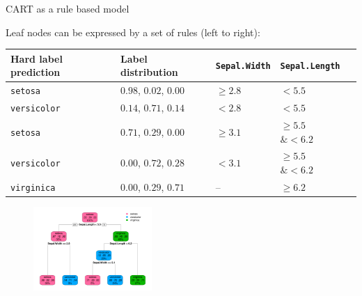 \documentclass[11pt,compress,t,notes=noshow, xcolor=table]{beamer}
\begin{document}
\begin{vbframe}{CART as a rule based model}

Leaf nodes can be expressed by a set of rules (left to right):

\begin{table}[]
\begin{tabular}{lllll}
Hard label prediction &  Label distribution & \texttt{Sepal.Width} & \texttt{Sepal.Length} \\
\hline
\texttt{setosa} & $0.98$, $0.02$, $0.00$ & $\geq 2.8$ & $< 5.5$ \\
\texttt{versicolor} & $0.14$, $0.71$, $0.14$ & $<2.8$ & $< 5.5$ \\
\texttt{setosa} & $0.71$, $0.29$, $0.00$ & $\geq 3.1$ & $\geq 5.5$ $\& < 6.2$ \\
\texttt{versicolor} & $0.00$, $0.72$, $0.28$ & $< 3.1$ & $\geq 5.5$ $\& < 6.2$\\
\texttt{virginica} & $0.00$, $0.29$, $0.71$ &  -- & $\geq 6.2$ \\

\end{tabular}
\end{table}

\begin{figure} 
\includegraphics[width=0.4\textwidth, keepaspectratio]{figure_man/tree_depth3_structure_wide.png}
\end{figure}


\end{vbframe}
\end{document}
